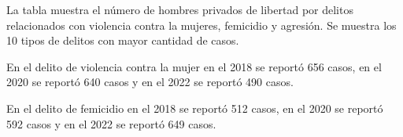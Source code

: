 La tabla muestra el número de hombres privados de libertad por delitos relacionados con violencia contra la mujeres, femicidio y agresión. Se muestra los 10 tipos de delitos con mayor cantidad de casos. 

En el delito de violencia contra la mujer en el 2018 se reportó 656 casos, en el 2020 se reportó 640 casos y en el 2022 se reportó 490 casos. 

En el delito de femicidio en el 2018 se reportó 512 casos, en el 2020 se reportó 592 casos y en el 2022 se reportó 649 casos. 
